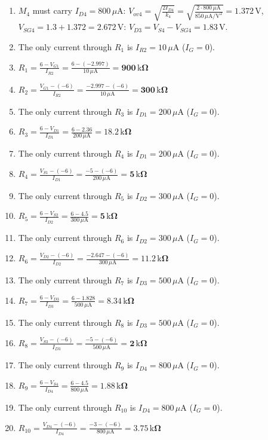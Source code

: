 \documentclass[11pt]{article}
\begin{document}
\begin{enumerate}[leftmargin=*,itemsep=3pt]
\item $M_{4}$ must carry $I_{D4} = 800\,\mu \mathrm{A}$: $V_{ov4} = \sqrt{\frac{2I_{D4}}{k_{4}}} = \sqrt{\frac{2\cdot800\,\mu \mathrm{A}}{850\,\mu \mathrm{A/V^2}}} = 1.372$\,V, $V_{SG4} = 1.3 + 1.372 = 2.672$\,V: $V_{D3} = V_{S4} - V_{SG4} = 1.83\,\mathrm{V}$.
\item The only current through $R_{1}$ is $I_{R2} = 10\,\mu \mathrm{A}$ ($I_G = 0$).
\item $\displaystyle R_{1} = \frac{6 - V_{G1}}{I_{R2}} = \frac{6 - (-2.997)}{10\,\mu \mathrm{A}} = \mathbf{900\,\mathrm{k}\Omega}$
\item $\displaystyle R_{2} = \frac{V_{G1} - (-6)}{I_{R2}} = \frac{-2.997 - (-6)}{10\,\mu \mathrm{A}} = \mathbf{300\,\mathrm{k}\Omega}$
\item The only current through $R_{3}$ is $I_{D1} = 200\,\mu \mathrm{A}$ ($I_G = 0$).
\item $\displaystyle R_{3} = \frac{6 - V_{D1}}{I_{D1}} = \frac{6 - 2.36}{200\,\mu \mathrm{A}} = \mathbf{18.2\,\mathrm{k}\Omega}$
\item The only current through $R_{4}$ is $I_{D1} = 200\,\mu \mathrm{A}$ ($I_G = 0$).
\item $\displaystyle R_{4} = \frac{V_{S1} - (-6)}{I_{D1}} = \frac{-5 - (-6)}{200\,\mu \mathrm{A}} = \mathbf{5\,\mathrm{k}\Omega}$
\item The only current through $R_{5}$ is $I_{D2} = 300\,\mu \mathrm{A}$ ($I_G = 0$).
\item $\displaystyle R_{5} = \frac{6 - V_{S2}}{I_{D2}} = \frac{6 - 4.5}{300\,\mu \mathrm{A}} = \mathbf{5\,\mathrm{k}\Omega}$
\item The only current through $R_{6}$ is $I_{D2} = 300\,\mu \mathrm{A}$ ($I_G = 0$).
\item $\displaystyle R_{6} = \frac{V_{D2} - (-6)}{I_{D2}} = \frac{-2.647 - (-6)}{300\,\mu \mathrm{A}} = \mathbf{11.2\,\mathrm{k}\Omega}$
\item The only current through $R_{7}$ is $I_{D3} = 500\,\mu \mathrm{A}$ ($I_G = 0$).
\item $\displaystyle R_{7} = \frac{6 - V_{D3}}{I_{D3}} = \frac{6 - 1.828}{500\,\mu \mathrm{A}} = \mathbf{8.34\,\mathrm{k}\Omega}$
\item The only current through $R_{8}$ is $I_{D3} = 500\,\mu \mathrm{A}$ ($I_G = 0$).
\item $\displaystyle R_{8} = \frac{V_{S3} - (-6)}{I_{D3}} = \frac{-5 - (-6)}{500\,\mu \mathrm{A}} = \mathbf{2\,\mathrm{k}\Omega}$
\item The only current through $R_{9}$ is $I_{D4} = 800\,\mu \mathrm{A}$ ($I_G = 0$).
\item $\displaystyle R_{9} = \frac{6 - V_{S4}}{I_{D4}} = \frac{6 - 4.5}{800\,\mu \mathrm{A}} = \mathbf{1.88\,\mathrm{k}\Omega}$
\item The only current through $R_{10}$ is $I_{D4} = 800\,\mu \mathrm{A}$ ($I_G = 0$).
\item $\displaystyle R_{10} = \frac{V_{D4} - (-6)}{I_{D4}} = \frac{-3 - (-6)}{800\,\mu \mathrm{A}} = \mathbf{3.75\,\mathrm{k}\Omega}$
\end{enumerate}
\end{document}
